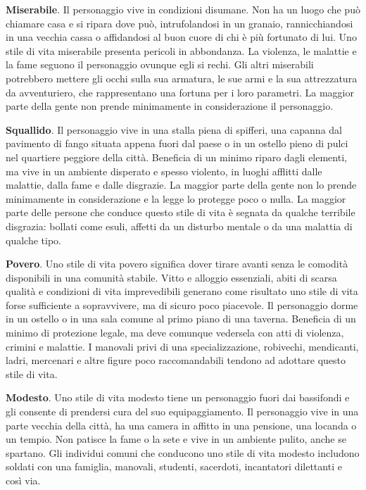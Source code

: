 \documentclass[a4paper,twoside,openany]{book}
\begin{document}
\begin{multicols}{2}
\textbf{Miserabile}. Il personaggio vive in condizioni disumane. Non ha un luogo che può chiamare casa e si ripara dove può, intrufolandosi in un granaio, rannicchiandosi in una vecchia cassa o affidandosi al buon cuore di chi è più fortunato di lui. Uno stile di vita miserabile presenta pericoli in abbondanza. La violenza, le malattie e la fame seguono il personaggio ovunque egli si rechi. Gli altri miserabili potrebbero mettere gli occhi sulla sua armatura, le sue armi e la sua attrezzatura da avventuriero, che rappresentano una fortuna per i loro parametri. La maggior parte della gente non prende minimamente in considerazione il personaggio.

\textbf{Squallido}. Il personaggio vive in una stalla piena di spifferi, una capanna dal pavimento di fango situata appena fuori dal paese o in un ostello pieno di pulci nel quartiere peggiore della città. Beneficia di un minimo riparo dagli elementi, ma vive in un ambiente disperato e spesso violento, in luoghi afflitti dalle malattie, dalla fame e dalle disgrazie. La maggior parte della gente non lo prende minimamente in considerazione e la legge lo protegge poco o nulla. La maggior parte delle persone che conduce questo stile di vita è segnata da qualche terribile disgrazia: bollati come esuli, affetti da un disturbo mentale o da una malattia di qualche tipo.

\textbf{Povero}. Uno stile di vita povero significa dover tirare avanti senza le comodità disponibili in una comunità stabile. Vitto e alloggio essenziali, abiti di scarsa qualità e condizioni di vita imprevedibili generano come risultato uno stile di vita forse sufficiente a sopravvivere, ma di sicuro poco piacevole. Il personaggio dorme in un ostello o in una sala comune al primo piano di una taverna. Beneficia di un minimo di protezione legale, ma deve comunque vedersela con atti di violenza, crimini e malattie. I manovali privi di una specializzazione, robivechi, mendicanti, ladri, mercenari e altre figure poco raccomandabili tendono ad adottare questo stile di vita.


\textbf{Modesto}. Uno stile di vita modesto tiene un personaggio fuori dai bassifondi e gli consente di prendersi cura del suo equipaggiamento. Il personaggio vive in una parte vecchia della città, ha una camera in affitto in una pensione, una locanda o un tempio. Non patisce la fame o la sete e vive in un ambiente pulito, anche se spartano. Gli individui comuni che conducono uno stile di vita modesto includono soldati con una famiglia, manovali, studenti, sacerdoti, incantatori dilettanti e così via.


\end{multicols}
\end{document}
